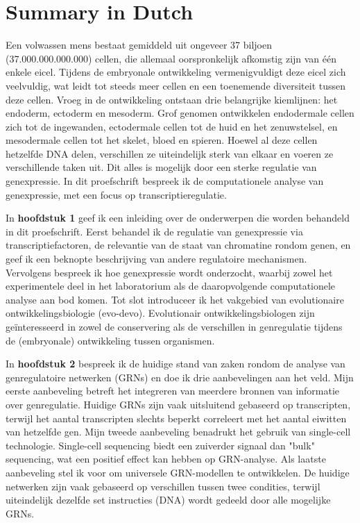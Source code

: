 \section{Summary in Dutch}

Een volwassen mens bestaat gemiddeld uit ongeveer 37 biljoen (37.000.000.000.000) cellen, die allemaal oorspronkelijk afkomstig zijn van \'e\'en enkele eicel. Tijdens de embryonale ontwikkeling vermenigvuldigt deze eicel zich veelvuldig, wat leidt tot steeds meer cellen en een toenemende diversiteit tussen deze cellen. Vroeg in de ontwikkeling ontstaan drie belangrijke kiemlijnen: het endoderm, ectoderm en mesoderm. Grof genomen ontwikkelen endodermale cellen zich tot de ingewanden, ectodermale cellen tot de huid en het zenuwstelsel, en mesodermale cellen tot het skelet, bloed en spieren. Hoewel al deze cellen hetzelfde DNA delen, verschillen ze uiteindelijk sterk van elkaar en voeren ze verschillende taken uit. Dit alles is mogelijk door een sterke regulatie van genexpressie. In dit proefschrift bespreek ik de computationele analyse van genexpressie, met een focus op transcriptieregulatie.

In \textbf{hoofdstuk 1} geef ik een inleiding over de onderwerpen die worden behandeld in dit proefschrift. Eerst behandel ik de regulatie van genexpressie via transcriptiefactoren, de relevantie van de staat van chromatine rondom genen, en geef ik een beknopte beschrijving van andere regulatoire mechanismen. Vervolgens bespreek ik hoe genexpressie wordt onderzocht, waarbij zowel het experimentele deel in het laboratorium als de daaropvolgende computationele analyse aan bod komen. Tot slot introduceer ik het vakgebied van evolutionaire ontwikkelingsbiologie (evo-devo). Evolutionair ontwikkelingsbiologen zijn geïnteresseerd in zowel de conservering als de verschillen in genregulatie tijdens de (embryonale) ontwikkeling tussen organismen.

In \textbf{hoofdstuk 2} bespreek ik de huidige stand van zaken rondom de analyse van genregulatoire netwerken (GRNs) en doe ik drie aanbevelingen aan het veld. Mijn eerste aanbeveling betreft het integreren van meerdere bronnen van informatie over genregulatie. Huidige GRNs zijn vaak uitsluitend gebaseerd op transcripten, terwijl het aantal transcripten slechts beperkt correleert met het aantal eiwitten van hetzelfde gen. Mijn tweede aanbeveling benadrukt het gebruik van single-cell technologie. Single-cell sequencing biedt een zuiverder signaal dan "bulk" sequencing, wat een positief effect kan hebben op GRN-analyse. Als laatste aanbeveling stel ik voor om universele GRN-modellen te ontwikkelen. De huidige netwerken zijn vaak gebaseerd op verschillen tussen twee condities, terwijl uiteindelijk dezelfde set instructies (DNA) wordt gedeeld door alle mogelijke GRNs.

